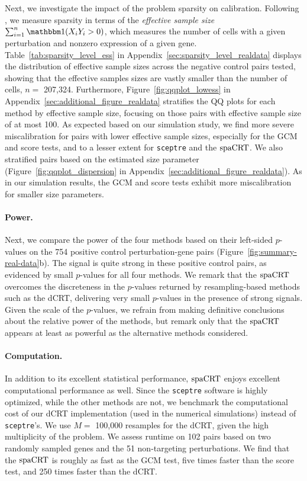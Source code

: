 \documentclass[12pt]{article}
\theoremstyle{definition}
\newcommand{\indicator}{\mathbbm 1}						%
\newcommand{\spacrt}{\textnormal{spaCRT}}               %
\begin{document}
  Next, we investigate the impact of the problem sparsity on calibration. Following \citet{Barry2024}, we measure sparsity in terms of the \textit{effective sample size} $\sum_{i = 1}^n \indicator(X_{i} Y_{i} > 0)$, which measures the number of cells with a given perturbation and nonzero expression of a given gene. Table~\ref{tab:sparsity_level_ess} in Appendix~\ref{sec:sparsity_level_realdata} displays the distribution of effective sample sizes across the negative control pairs tested, showing that the effective samples sizes are vastly smaller than the number of cells, $n =$ 207,324. Furthermore, Figure~\ref{fig:qqplot_lowess} in Appendix~\ref{sec:additional_figure_realdata} stratifies the QQ plots for each method by effective sample size, focusing on those pairs with effective sample size of at most 100. As expected based on our simulation study, we find more severe miscalibration for pairs with lower effective sample sizes, especially for the GCM and score tests, and to a lesser extent for \verb|sceptre| and the $\spacrt$. We also stratified pairs based on the estimated size parameter (Figure~\ref{fig:qqplot_dispersion} in Appendix~\ref{sec:additional_figure_realdata}). As in our simulation results, the GCM and score tests exhibit more miscalibration for smaller size parameters. 
  
  \paragraph{Power.}
  
  Next, we compare the power of the four methods based on their left-sided $p$-values on the 754 positive control perturbation-gene pairs (Figure~\ref{fig:summary-real-data}b). The signal is quite strong in these positive control pairs, as evidenced by small $p$-values for all four methods. We remark that the $\spacrt$ overcomes the discreteness in the $p$-values returned by resampling-based methods such as the dCRT, delivering very small $p$-values in the presence of strong signals. Given the scale of the $p$-values, we refrain from making definitive conclusions about the relative power of the methods, but remark only that the $\spacrt$ appears at least as powerful as the alternative methods considered.
  
  
  \paragraph{Computation.}
  
  In addition to its excellent statistical performance, $\spacrt$ enjoys excellent computational performance as well. Since the \verb|sceptre| software is highly optimized, while the other methods are not, we benchmark the computational cost of our dCRT implementation (used in the numerical simulations) instead of \verb|sceptre|'s. We use $M = $ 100,000 resamples for the dCRT, given the high multiplicity of the problem. We assess runtime on 102 pairs based on two randomly sampled genes and the 51 non-targeting perturbations. We find that the $\spacrt$ is roughly as fast as the GCM test, five times faster than the score test, and 250 times faster than the dCRT.
  
\end{document}
